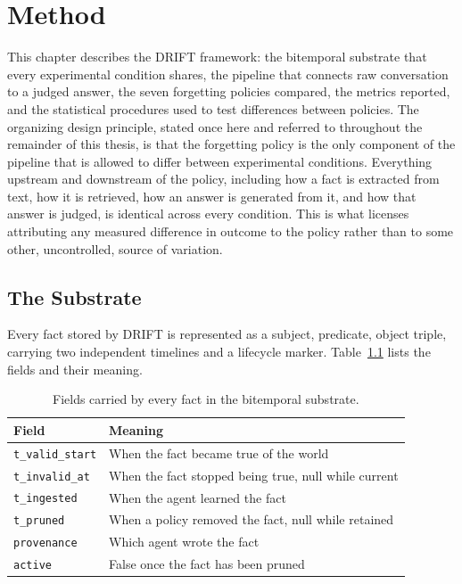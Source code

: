 \chapter{Method}
\label{chap:method}

This chapter describes the DRIFT framework: the bitemporal substrate that every experimental condition shares, the pipeline that connects raw conversation to a judged answer, the seven forgetting policies compared, the metrics reported, and the statistical procedures used to test differences between policies. The organizing design principle, stated once here and referred to throughout the remainder of this thesis, is that the forgetting policy is the only component of the pipeline that is allowed to differ between experimental conditions. Everything upstream and downstream of the policy, including how a fact is extracted from text, how it is retrieved, how an answer is generated from it, and how that answer is judged, is identical across every condition. This is what licenses attributing any measured difference in outcome to the policy rather than to some other, uncontrolled, source of variation.

\section{The Substrate}
\label{sec:substrate}

Every fact stored by DRIFT is represented as a subject, predicate, object triple, carrying two independent timelines and a lifecycle marker. Table~\ref{tab:fact-fields} lists the fields and their meaning.

\begin{table}[H]
\centering
\caption{Fields carried by every fact in the bitemporal substrate.}
\label{tab:fact-fields}
\begin{tabular}{lp{4.3in}}
\toprule
Field & Meaning \\
\midrule
\texttt{t\_valid\_start} & When the fact became true of the world \\
\texttt{t\_invalid\_at} & When the fact stopped being true, null while current \\
\texttt{t\_ingested} & When the agent learned the fact \\
\texttt{t\_pruned} & When a policy removed the fact, null while retained \\
\texttt{provenance} & Which agent wrote the fact \\
\texttt{active} & False once the fact has been pruned \\
\bottomrule
\end{tabular}
\end{table}

